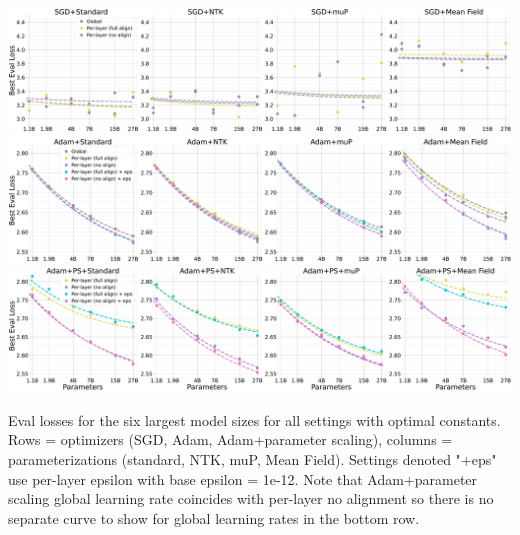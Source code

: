 \clearpage

\thispagestyle{plain}
\begin{SidewaysFigure}
\includegraphics[width=\linewidth, trim={0, 0, 0, 0},clip]{icml2024/figures/per_layer_lr_appendix/sgd_appendix_grid.pdf}
\includegraphics[width=\linewidth, trim={0, 0, 0, 0},clip]{icml2024/figures/per_layer_lr_appendix/adamw_appendix_grid.pdf}
\includegraphics[width=\linewidth, trim={0, 0, 0, 0},clip]{icml2024/figures/per_layer_lr_appendix/adam_ps_appendix_grid.pdf}
\caption{Eval losses for the six largest model sizes for all settings with optimal constants. Rows = optimizers (SGD, Adam, Adam+parameter scaling), columns = parameterizations (standard, NTK, muP, Mean Field). Settings denoted "+eps" use per-layer epsilon with base epsilon = 1e-12. Note that Adam+parameter scaling global learning rate coincides with per-layer no alignment so there is no separate curve to show for global learning rates in the bottom row.}
\label{fig:app_scaling_optimal_constants}
\end{SidewaysFigure}
\clearpage

